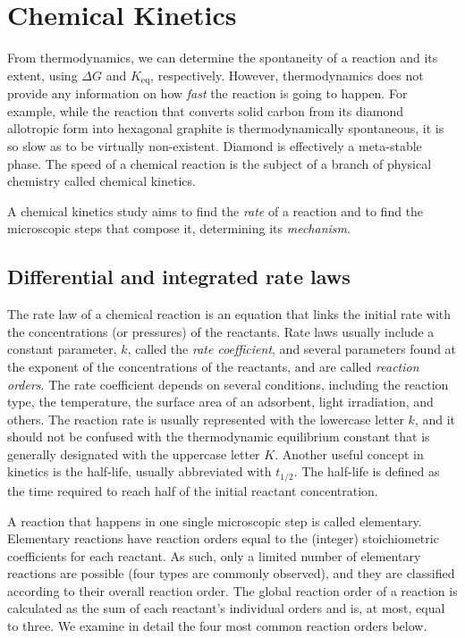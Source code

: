 \documentclass[
  9pt,
]{extbook}
\theoremstyle{definition}
\theoremstyle{definition}
\theoremstyle{definition}
\theoremstyle{remark}
\begin{document}
\hypertarget{Kinetics}{%
\chapter{Chemical Kinetics}\label{Kinetics}}

From thermodynamics, we can determine the spontaneity of a reaction and its extent, using \(\Delta G\) and \(K_{\text{eq}}\), respectively. However, thermodynamics does not provide any information on how \emph{fast} the reaction is going to happen. For example, while the reaction that converts solid carbon from its diamond allotropic form into hexagonal graphite is thermodynamically spontaneous, it is so slow as to be virtually non-existent. Diamond is effectively a meta-stable phase. The speed of a chemical reaction is the subject of a branch of physical chemistry called chemical kinetics.

A chemical kinetics study aims to find the \emph{rate} of a reaction and to find the microscopic steps that compose it, determining its \emph{mechanism}.

\hypertarget{diffintk}{%
\section{Differential and integrated rate laws}\label{diffintk}}

The rate law of a chemical reaction is an equation that links the initial rate with the concentrations (or pressures) of the reactants. Rate laws usually include a constant parameter, \(k\), called the \emph{rate coefficient}, and several parameters found at the exponent of the concentrations of the reactants, and are called \emph{reaction orders}. The rate coefficient depends on several conditions, including the reaction type, the temperature, the surface area of an adsorbent, light irradiation, and others. The reaction rate is usually represented with the lowercase letter \(k\), and it should not be confused with the thermodynamic equilibrium constant that is generally designated with the uppercase letter \(K\). Another useful concept in kinetics is the half-life, usually abbreviated with \(t_{1/2}\). The half-life is defined as the time required to reach half of the initial reactant concentration.

A reaction that happens in one single microscopic step is called elementary. Elementary reactions have reaction orders equal to the (integer) stoichiometric coefficients for each reactant. As such, only a limited number of elementary reactions are possible (four types are commonly observed), and they are classified according to their overall reaction order. The global reaction order of a reaction is calculated as the sum of each reactant's individual orders and is, at most, equal to three. We examine in detail the four most common reaction orders below.
\end{document}
